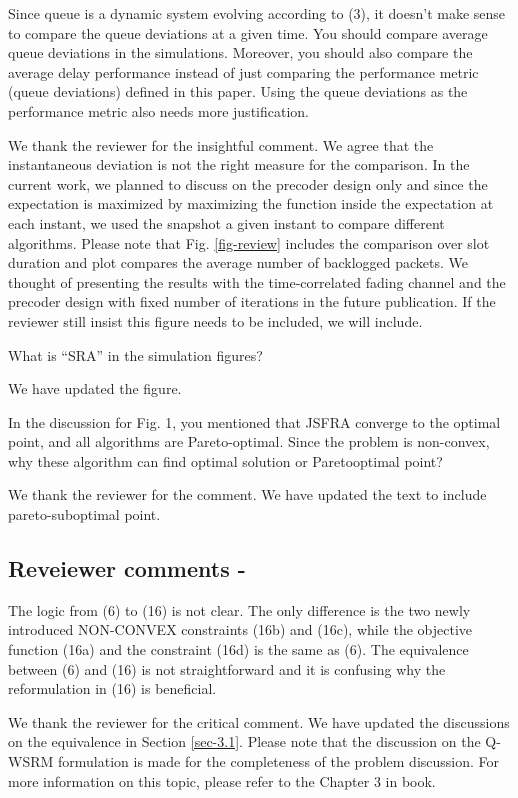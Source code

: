  Since queue is a dynamic system evolving according to (3), it doesn’t make sense to compare the queue deviations at a given time. You should compare average queue deviations in the simulations. Moreover, you should also compare the average delay performance instead of just comparing the performance metric (queue deviations) defined in this paper. Using the queue deviations as the performance metric also needs more justification.

\resp We thank the reviewer for the insightful comment. We agree that the instantaneous deviation is not the right measure for the comparison. In the current work, we planned to discuss on the precoder design only and since the expectation is maximized by maximizing the function inside the expectation at each instant, we used the snapshot a given instant to compare different algorithms. Please note that Fig. \ref{fig-review} includes the comparison over  slot duration and plot compares the average number of backlogged packets. We thought of presenting the results with the time-correlated fading channel and the precoder design with fixed number of iterations in the future publication. If the reviewer still insist this figure needs to be included, we will include.

 What is “SRA” in the simulation figures?

\resp We have updated the figure.

 In the discussion for Fig. 1, you mentioned that JSFRA converge to the optimal point, and all algorithms are Pareto-optimal. Since the problem is non-convex, why these algorithm can find optimal solution or Paretooptimal point? 

\resp We thank the reviewer for the comment. We have updated the text to include pareto-suboptimal point.


\subsection*{Reveiewer comments - }

 The logic from (6) to (16) is not clear. The only difference is the two newly introduced NON-CONVEX constraints (16b) and (16c), while the objective function (16a) and the constraint (16d) is the same as (6). The equivalence between (6) and (16) is not straightforward and it is confusing why the reformulation in (16) is beneficial.

\resp We thank the reviewer for the critical comment. We have updated the discussions on the equivalence in Section \ref{sec-3.1}. Please note that the discussion on the \ac{Q-WSRM} formulation is made for the completeness of the problem discussion. For more information on this topic, please refer to the Chapter 3 in \cite{neely2010stochastic} book.

